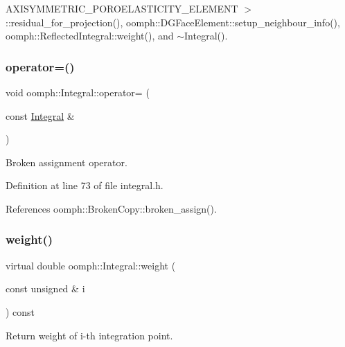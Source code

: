 A\+X\+I\+S\+Y\+M\+M\+E\+T\+R\+I\+C\+\_\+\+P\+O\+R\+O\+E\+L\+A\+S\+T\+I\+C\+I\+T\+Y\+\_\+\+E\+L\+E\+M\+E\+N\+T $>$\+::residual\+\_\+for\+\_\+projection(), oomph\+::\+D\+G\+Face\+Element\+::setup\+\_\+neighbour\+\_\+info(), oomph\+::\+Reflected\+Integral\+::weight(), and $\sim$\+Integral().

\mbox{\label{classoomph_1_1Integral_aa3f5ba2220febc43ce8e606198d87ef0}} 
\subsubsection{\texorpdfstring{operator=()}{operator=()}}
{\footnotesize\ttfamily void oomph\+::\+Integral\+::operator= (\begin{DoxyParamCaption}\item[{const \hyperlink{classoomph_1_1Integral}{Integral} \&}]{ }\end{DoxyParamCaption})\hspace{0.3cm}{\ttfamily [inline]}}



Broken assignment operator. 



Definition at line 73 of file integral.\+h.



References oomph\+::\+Broken\+Copy\+::broken\+\_\+assign().

\mbox{\label{classoomph_1_1Integral_ac65335e2aab120b285b3d6c294507b06}} 
\subsubsection{\texorpdfstring{weight()}{weight()}}
{\footnotesize\ttfamily virtual double oomph\+::\+Integral\+::weight (\begin{DoxyParamCaption}\item[{const unsigned \&}]{i }\end{DoxyParamCaption}) const\hspace{0.3cm}{\ttfamily [pure virtual]}}



Return weight of i-\/th integration point. 



